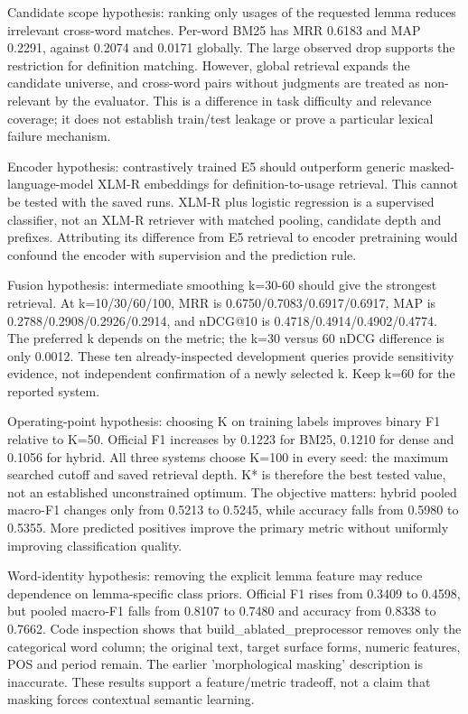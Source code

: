Candidate scope hypothesis: ranking only usages of the requested lemma reduces irrelevant cross-word matches. Per-word BM25 has MRR 0.6183 and MAP 0.2291, against 0.2074 and 0.0171 globally. The large observed drop supports the restriction for definition matching. However, global retrieval expands the candidate universe, and cross-word pairs without judgments are treated as non-relevant by the evaluator. This is a difference in task difficulty and relevance coverage; it does not establish train/test leakage or prove a particular lexical failure mechanism.

Encoder hypothesis: contrastively trained E5 should outperform generic masked-language-model XLM-R embeddings for definition-to-usage retrieval. This cannot be tested with the saved runs. XLM-R plus logistic regression is a supervised classifier, not an XLM-R retriever with matched pooling, candidate depth and prefixes. Attributing its difference from E5 retrieval to encoder pretraining would confound the encoder with supervision and the prediction rule.

Fusion hypothesis: intermediate smoothing k=30-60 should give the strongest retrieval. At k=10/30/60/100, MRR is 0.6750/0.7083/0.6917/0.6917, MAP is 0.2788/0.2908/0.2926/0.2914, and nDCG@10 is 0.4718/0.4914/0.4902/0.4774. The preferred k depends on the metric; the k=30 versus 60 nDCG difference is only 0.0012. These ten already-inspected development queries provide sensitivity evidence, not independent confirmation of a newly selected k. Keep k=60 for the reported system.

Operating-point hypothesis: choosing K on training labels improves binary F1 relative to K=50. Official F1 increases by 0.1223 for BM25, 0.1210 for dense and 0.1056 for hybrid. All three systems choose K=100 in every seed: the maximum searched cutoff and saved retrieval depth. K* is therefore the best tested value, not an established unconstrained optimum. The objective matters: hybrid pooled macro-F1 changes only from 0.5213 to 0.5245, while accuracy falls from 0.5980 to 0.5355. More predicted positives improve the primary metric without uniformly improving classification quality.

Word-identity hypothesis: removing the explicit lemma feature may reduce dependence on lemma-specific class priors. Official F1 rises from 0.3409 to 0.4598, but pooled macro-F1 falls from 0.8107 to 0.7480 and accuracy from 0.8338 to 0.7662. Code inspection shows that build\_ablated\_preprocessor removes only the categorical word column; the original text, target surface forms, numeric features, POS and period remain. The earlier 'morphological masking' description is inaccurate. These results support a feature/metric tradeoff, not a claim that masking forces contextual semantic learning.

